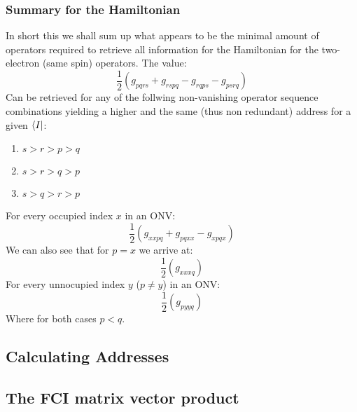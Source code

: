 \documentclass[12p]{article}
\begin{document}
\subsubsection{Summary for the Hamiltonian}
In short this we shall sum up what appears to be the minimal amount of operators required to retrieve all information for the Hamiltonian for the two-electron (same spin) operators.
The value:
\begin{equation}
  \frac{1}{2} (g_{pqrs} + g_{rspq} - g_{rqps} - g_{psrq})
\end{equation}
 Can be retrieved for any of the follwing non-vanishing operator sequence combinations yielding a higher and the same (thus non redundant) address for a given $\bra{I}$:
\begin{enumerate}
  \item $s > r > p > q$
  \item $s > r > q > p$
  \item $s > q > r > p$
\end{enumerate}
For every occupied index $x$ in an ONV:
\begin{equation}
  \frac{1}{2} (g_{xxpq} + g_{pqxx} - g_{xpqx})
\end{equation}
We can also see that for $p=x$ we arrive at:
\begin{equation}
  \frac{1}{2} (g_{xxxq})
\end{equation}
For every unnocupied index $y$ ($p \neq y$) in an ONV:
\begin{equation}
  \frac{1}{2} (g_{pyyq})
\end{equation}
Where for both cases $p<q$.
\subsection{Calculating Addresses}
\subsection{The FCI matrix vector product}
\end{document}

